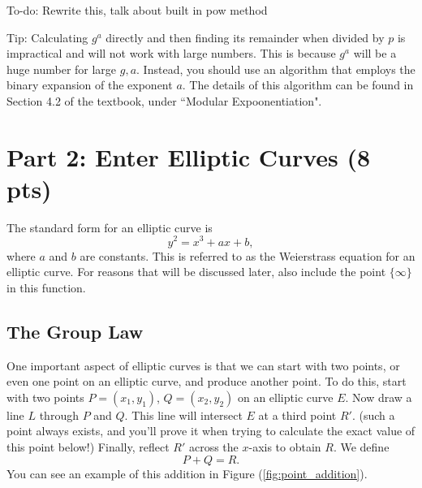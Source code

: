 \documentclass{article}
\begin{document}
\begin{tcolorbox}[enhanced,interior style={top color=Plum!20,bottom color=Plum!30}]
        \vspace{2mm}

        To-do: Rewrite this, talk about built in pow method


        Tip: Calculating $g^{a}$ directly and then finding its remainder when divided by $p$ is impractical and will not work with large numbers. This is because $g^{a}$ will be a huge number for large $g, a$. Instead, you should use an algorithm that employs the binary expansion of the exponent $a$. The details of this algorithm can be found in Section 4.2 of the textbook, under ``Modular Expoonentiation".
    \end{tcolorbox}



\section*{Part 2: Enter Elliptic Curves (8 pts)}

The standard form for an elliptic curve is $$y^{2} = x^{3} + ax + b,$$ where $a$ and $b$ are constants. This is referred to as the Weierstrass equation for an elliptic curve. For reasons that will be discussed later, also include the point $\{\infty\}$ in this function.

\subsection*{The Group Law}
    One important aspect of elliptic curves is that we can start with two points, or even one point on an elliptic curve, and produce another point. To do this, start with two points $P = (x_{1}, y_{1})$, $Q = (x_{2}, y_{2})$ on an elliptic curve $E$. Now draw a line $L$ through $P$ and $Q$. This line will intersect $E$ at a third point $R'$. (such a point always exists, and you'll prove it when trying to calculate the exact value of this point below!) Finally, reflect $R'$ across the $x$-axis to obtain $R$. We define $$P + Q = R.$$ You can see an example of this addition in Figure (\ref{fig:point_addition}).
\end{document}
